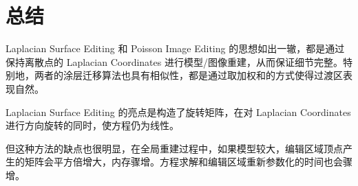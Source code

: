 \documentclass[lang=cn,11pt,a4paper]{elegantpaper}
\begin{document}
\section{总结}
Laplacian Surface Editing 和 Poisson Image Editing 的思想如出一辙，都是通过保持离散点的 Laplacian Coordinates 进行模型/图像重建，从而保证细节完整。特别地，两者的涂层迁移算法也具有相似性，都是通过取加权和的方式使得过渡区表现自然。

Laplacian Surface Editing 的亮点是构造了旋转矩阵，在对 Laplacian Coordinates 进行方向旋转的同时，使方程仍为线性。

但这种方法的缺点也很明显，在全局重建过程中，如果模型较大，编辑区域顶点产生的矩阵会平方倍增大，内存骤增。方程求解和编辑区域重新参数化的时间也会骤增。


\nocite{*}
\printbibliography[heading=bibintoc, title=\ebibname]
\end{document}
